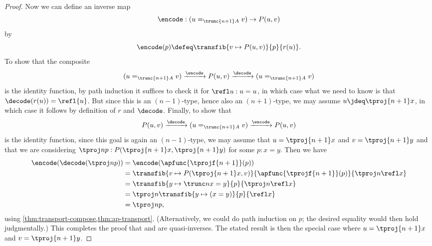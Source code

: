 \begin{proof}
  Now we can define an inverse map
  \[\encode: (u=_{\trunc{n+1}A}v) \to P(u,v)\]
  by
  \[\encode(p) \defeq \transfib{v\mapsto P(u,v)}{p}{r(u)}. \]
  To show that the composite
  \[ (u=_{\trunc{n+1}A}v) \xrightarrow{\encode} P(u,v) \xrightarrow{\decode} (u=_{\trunc{n+1}A}v) \]
  is the identity function, by path induction it suffices to check it for $\refl u : u=u$, in which case what we need to know is that
$\decode(r(u)) = \refl{u}$.
  But since this is an $(n-1)$-type, hence also an $(n+1)$-type, we may assume $u\jdeq \tproj {n+1} x$, in which case it follows by definition
of $r$ and $\decode$.
  Finally, to show that
  \[ P(u,v) \xrightarrow{\decode} (u=_{\trunc{n+1}A}v) \xrightarrow{\encode} P(u,v) \]
  is the identity function, since this goal is again an $(n-1)$-type, we may assume that $u=\tproj {n+1}x$ and $v=\tproj {n+1}y$ and that we are
considering $\tproj n p:P(\tproj{n+1}x,\tproj{n+1}y)$ for some $p:x=y$.
  Then we have
  \begin{align*}
    \encode(\decode(\tproj n p)) &= \encode(\apfunc{\tprojf{n+1}}(p))\\
    &= \transfib{v\mapsto P(\tproj{n+1}x,v)}{\apfunc{\tprojf{n+1}}(p)}{\tproj n {\refl x}}\\
    &= \transfib{y\mapsto \trunc n{x=y}}{p}{\tproj n {\refl x}}\\
    &= \tproj n {\transfib{y \mapsto (x=y)}{p}{\refl x}}\\
    &= \tproj n p,
  \end{align*}
  using \cref{thm:transport-compose,thm:ap-transport}.
  (Alternatively, we could do path induction on $p$; the desired equality would then hold judgmentally.)
  This completes the proof that \decode and \encode are quasi-inverses.
  The stated result is then the special case where $u=\tproj {n+1}x$ and $v=\tproj {n+1}y$.
\end{proof}
